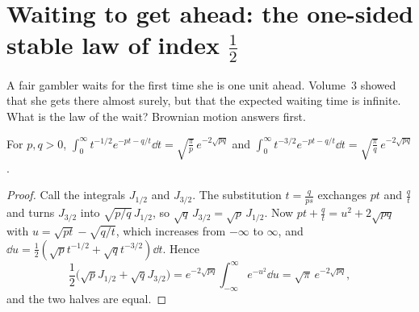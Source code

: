 \section{Waiting to get ahead: the one-sided stable law of index $\frac12$}

A fair gambler waits for the first time she is one unit ahead. Volume~3 showed that she gets there almost surely, but that the expected waiting time is
infinite. What is the law of the wait? Brownian motion answers first.

\begin{lemma}\label{lem:schlomilch}
For $p,q>0$, $\displaystyle\int_0^\infty t^{-1/2}e^{-pt-q/t}\dd t=\sqrt{\frac\pi p}\,e^{-2\sqrt{pq}}$ and $\displaystyle\int_0^\infty t^{-3/2}e^{-pt-q/t}\dd t=\sqrt{\frac\pi q}\,e^{-2\sqrt{pq}}$.
\end{lemma}
\begin{proof}
Call the integrals $J_{1/2}$ and $J_{3/2}$. The substitution $t=\frac q{ps}$ exchanges $pt$ and $\frac qt$ and turns $J_{3/2}$ into $\sqrt{p/q}\,J_{1/2}$, so
$\sqrt q\,J_{3/2}=\sqrt p\,J_{1/2}$. Now $pt+\frac qt=u^2+2\sqrt{pq}$ with $u=\sqrt{pt}-\sqrt{q/t}$, which increases from $-\infty$ to $\infty$, and
$\dd u=\frac12(\sqrt pt^{-1/2}+\sqrt qt^{-3/2})\dd t$. Hence
\[
\frac12\bigl(\sqrt pJ_{1/2}+\sqrt qJ_{3/2}\bigr)=e^{-2\sqrt{pq}}\int_{-\infty}^\infty e^{-u^2}\dd u=\sqrt\pi\,e^{-2\sqrt{pq}},
\]
and the two halves are equal.
\end{proof}

